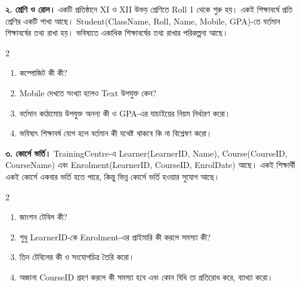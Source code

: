 \textbf{২. শ্রেণি ও রোল।} একটি প্রতিষ্ঠানে XI ও XII উভয় শ্রেণিতে Roll 1 থেকে শুরু হয়। একই শিক্ষাবর্ষে প্রতি শ্রেণির একটি শাখা আছে। Student(ClassName, Roll, Name, Mobile, GPA)-তে বর্তমান শিক্ষাবর্ষের তথ্য রাখা হয়। ভবিষ্যতে একাধিক শিক্ষাবর্ষের তথ্য রাখার পরিকল্পনা আছে।
\begin{multicols}{2}
\begin{enumerate}
\item[ক.] \begin{minipage}[t]{\linewidth}কম্পোজিট কী কী?
\end{minipage}
\item[খ.] \begin{minipage}[t]{\linewidth}Mobile দেখতে সংখ্যা হলেও Text উপযুক্ত কেন?
\end{minipage}
\item[গ.] \begin{minipage}[t]{\linewidth}বর্তমান কাঠামোয় উপযুক্ত অনন্য কী ও GPA-এর যাচাইয়ের নিয়ম নির্ধারণ করো।
\end{minipage}
\item[ঘ.] \begin{minipage}[t]{\linewidth}ভবিষ্যৎ শিক্ষাবর্ষ যোগ হলে বর্তমান কী যথেষ্ট থাকবে কি না বিশ্লেষণ করো।
\end{minipage}
\end{enumerate}
\end{multicols}

\textbf{৩. কোর্সে ভর্তি।} TrainingCentre-এ Learner(LearnerID, Name), Course(CourseID, CourseName) এবং Enrolment(LearnerID, CourseID, EnrolDate) আছে। একই শিক্ষার্থী একই কোর্সে একবার ভর্তি হতে পারে, কিন্তু ভিন্ন কোর্সে ভর্তি হওয়ার সুযোগ আছে।
\begin{multicols}{2}
\begin{enumerate}
\item[ক.] \begin{minipage}[t]{\linewidth}জাংশন টেবিল কী?
\end{minipage}
\item[খ.] \begin{minipage}[t]{\linewidth}শুধু LearnerID-কে Enrolment-এর প্রাইমারি কী করলে সমস্যা কী?
\end{minipage}
\item[গ.] \begin{minipage}[t]{\linewidth}তিন টেবিলের কী ও সংযোগচিত্র তৈরি করো।
\end{minipage}
\item[ঘ.] \begin{minipage}[t]{\linewidth}অজানা CourseID গ্রহণ করলে কী সমস্যা হবে এবং কোন বিধি তা প্রতিরোধ করে, ব্যাখ্যা করো।
\end{minipage}
\end{enumerate}
\end{multicols}

